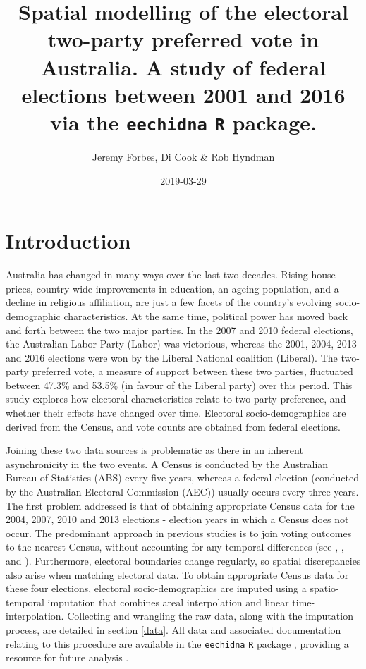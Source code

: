\documentclass[openany]{book}
\title{Spatial modelling of the electoral two-party preferred vote in Australia. A study of federal elections between 2001 and 2016 via the \texttt{eechidna} \texttt{R} package.}
\author{Jeremy Forbes, Di Cook \& Rob Hyndman}
\date{2019-03-29}
\begin{document}
\maketitle

{
\setcounter{tocdepth}{1}
\tableofcontents
}
\hypertarget{intro}{%
\chapter{Introduction}\label{intro}}

Australia has changed in many ways over the last two decades. Rising house prices, country-wide improvements in education, an ageing population, and a decline in religious affiliation, are just a few facets of the country's evolving socio-demographic characteristics. At the same time, political power has moved back and forth between the two major parties. In the 2007 and 2010 federal elections, the Australian Labor Party (Labor) was victorious, whereas the 2001, 2004, 2013 and 2016 elections were won by the Liberal National coalition (Liberal). The two-party preferred vote, a measure of support between these two parties, fluctuated between 47.3\% and 53.5\% (in favour of the Liberal party) over this period. This study explores how electoral characteristics relate to two-party preference, and whether their effects have changed over time. Electoral socio-demographics are derived from the Census, and vote counts are obtained from federal elections.

Joining these two data sources is problematic as there in an inherent asynchronicity in the two events. A Census is conducted by the Australian Bureau of Statistics (ABS) every five years, whereas a federal election (conducted by the Australian Electoral Commission (AEC)) usually occurs every three years. The first problem addressed is that of obtaining appropriate Census data for the 2004, 2007, 2010 and 2013 elections - election years in which a Census does not occur. The predominant approach in previous studies is to join voting outcomes to the nearest Census, without accounting for any temporal differences (see \citet{DavisStimson98}, \citet{Stimson06}, \citet{Liao09} and \citet{Stimson09}). Furthermore, electoral boundaries change regularly, so spatial discrepancies also arise when matching electoral data. To obtain appropriate Census data for these four elections, electoral socio-demographics are imputed using a spatio-temporal imputation that combines areal interpolation \citep{Goodchild1993} and linear time-interpolation. Collecting and wrangling the raw data, along with the imputation process, are detailed in section \ref{data}. All data and associated documentation relating to this procedure are available in the \texttt{eechidna} \texttt{R} package \citep{eechidna}, providing a resource for future analysis .
\end{document}
